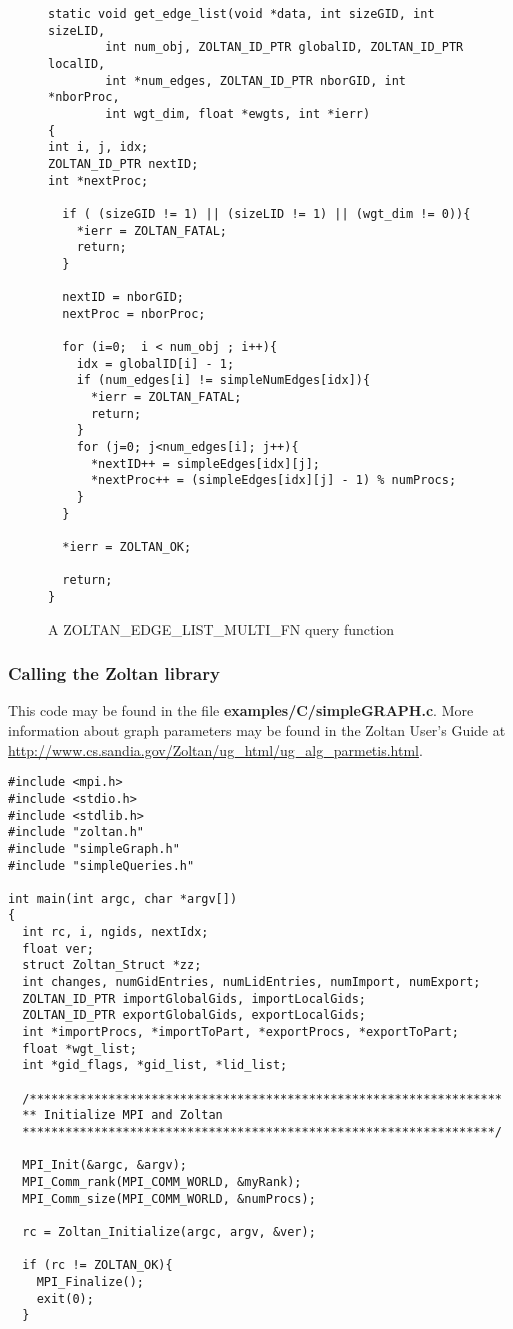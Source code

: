 \begin{figure}
\begin{flushleft}
\begin{verbatim}
static void get_edge_list(void *data, int sizeGID, int sizeLID,
        int num_obj, ZOLTAN_ID_PTR globalID, ZOLTAN_ID_PTR localID,
        int *num_edges, ZOLTAN_ID_PTR nborGID, int *nborProc,
        int wgt_dim, float *ewgts, int *ierr)
{
int i, j, idx;
ZOLTAN_ID_PTR nextID;
int *nextProc;

  if ( (sizeGID != 1) || (sizeLID != 1) || (wgt_dim != 0)){
    *ierr = ZOLTAN_FATAL;
    return;
  }

  nextID = nborGID;
  nextProc = nborProc;

  for (i=0;  i < num_obj ; i++){
    idx = globalID[i] - 1;
    if (num_edges[i] != simpleNumEdges[idx]){
      *ierr = ZOLTAN_FATAL;
      return;
    }
    for (j=0; j<num_edges[i]; j++){
      *nextID++ = simpleEdges[idx][j];
      *nextProc++ = (simpleEdges[idx][j] - 1) % numProcs;
    }
  }

  *ierr = ZOLTAN_OK;

  return;
}
\end{verbatim}
\end{flushleft}
\caption{A ZOLTAN\_EDGE\_LIST\_MULTI\_FN query function}
\label{fig:EdgeListMulti}
\end{figure}

\clearpage

\subsubsection{Calling the Zoltan library}

This code may be found in the 
file \textbf{examples/C/simpleGRAPH.c}.
More information about graph parameters 
may be found in the Zoltan User's Guide at
\url{http://www.cs.sandia.gov/Zoltan/ug_html/ug_alg_parmetis.html}.

\begin{flushleft}
\begin{verbatim}
#include <mpi.h>
#include <stdio.h>
#include <stdlib.h>
#include "zoltan.h"
#include "simpleGraph.h"
#include "simpleQueries.h"

int main(int argc, char *argv[])
{
  int rc, i, ngids, nextIdx;
  float ver;
  struct Zoltan_Struct *zz;
  int changes, numGidEntries, numLidEntries, numImport, numExport;
  ZOLTAN_ID_PTR importGlobalGids, importLocalGids;
  ZOLTAN_ID_PTR exportGlobalGids, exportLocalGids;
  int *importProcs, *importToPart, *exportProcs, *exportToPart;
  float *wgt_list;
  int *gid_flags, *gid_list, *lid_list;

  /******************************************************************
  ** Initialize MPI and Zoltan
  ******************************************************************/

  MPI_Init(&argc, &argv);
  MPI_Comm_rank(MPI_COMM_WORLD, &myRank);
  MPI_Comm_size(MPI_COMM_WORLD, &numProcs);

  rc = Zoltan_Initialize(argc, argv, &ver);

  if (rc != ZOLTAN_OK){
    MPI_Finalize();
    exit(0);
  }
\end{verbatim}
\end{flushleft}

